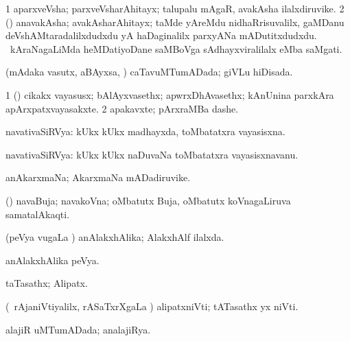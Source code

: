 \bentry
{}
\gl{\nA}
\bmng
\bnum
\num{1} aparxveVsha; parxveVsharAhitayx; talupalu mAgaR, avakAsha ilalxdiruvike. 
\num{2} (\nAyxshA) anavakAsha; avakAsharAhitayx; taMde yAreMdu nidhaRrisuvalilx, gaMDanu deVshAMtaradalilxdudxdu yA haDaginalilx parxyANa mADutitxdudxdu. \mo\ kAraNagaLiMda heMDatiyoDane saMBoVga sAdhayxviralilalx eMba saMgati. 
\enum
\emng
\eentry

\bentry
{}
\gl{\gu}
\bmng
(mAdaka vasutx, aBAyxsa, \mo) caTavuMTumADada; giVLu hiDisada. 
\emng
\eentry

\bentry
{}
\gl{\nA}
\bmng
\bnum
\num{1} (\ca) cikakx vayasusx; bAlAyxvasethx; apwrxDhAvasethx; kAnUnina parxkAra apArxpatxvayasakxte. 
\num{2} apakavxte; pArxraMBa dashe. 
\enum
\emng
\eentry

\bentry
{}
\gl{\nA}
\bmng
navativaSiRVya: kUkx kUkx madhayxda, toMbatatxra vayasisxna. 
\emng
\eentry

\bentry
{}
\gl{\nA}
\bmng
navativaSiRVya: kUkx kUkx naDuvaNa toMbatatxra vayasisxnavanu. 
\emng
\eentry

\bentry
{}
\gl{\nA}
\bmng
anAkarxmaNa; AkarxmaNa mADadiruvike. 
\emng
\eentry

\bentry
{}
\gl{\nA}
\bmng
(\ga) navaBuja; navakoVna; oMbatutx Buja, oMbatutx koVnagaLiruva samatalAkaqti.  
\emng
\eentry

\bentry
{}
\gl{\gu}
\bmng
(peVya \mo vugaLa \vi) anAlakxhAlika; AlakxhAlf ilalxda. 
\emng
\eentry

\bentry
{}
\gl{\nA}
\bmng
anAlakxhAlika peVya. 
\emng
\eentry

\bentry
{}
\gl{\gu}
\bmng
taTasathx; Alipatx. 
\emng
\eentry

\bentry
{}
\gl{\nA}
\bmng
(\kanmu\ rAjaniVtiyalilx, rASaTxrXgaLa \vi) alipatxniVti; tATasathx yx niVti. 
\emng
\eentry 

\bentry
{}
\gl{\gu}
\bmng
alajiR uMTumADada; analajiRya. 
\emng
\eentry

